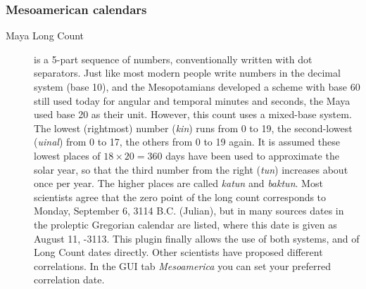 \subsubsection{Mesoamerican calendars}
\begin{description}
\item[Maya Long Count] is a 5-part sequence of numbers, conventionally 
  written with dot separators. Just like most
  modern people write numbers in the decimal system (base 10), and the
  Mesopotamians developed a scheme with base 60 still used today for
  angular and temporal minutes and seconds, the Maya used base 20 as their
  unit. However, this count uses a mixed-base system. The lowest
  (rightmost) number (\emph{kin}) runs from 0 to 19, the second-lowest
  (\emph{uinal}) from 0 to 17, the others from 0 to 19 again. It is
  assumed these lowest places of $18\times20=360$ days have been used
  to approximate the solar year, so that the third number from the
  right (\emph{tun}) increases about once per year. The higher places
  are called \emph{katun} and \emph{baktun}. Most scientists agree
  that the zero point of the long count corresponds to Monday,
  September 6, 3114 B.C. (Julian), but in many sources dates in the
  proleptic Gregorian calendar are listed, where this date is given as
  August 11, -3113. This plugin finally allows the use of both
  systems, and of Long Count dates directly. Other scientists have 
  proposed different correlations. In the GUI tab \emph{Mesoamerica} 
  you can set your preferred correlation date.  


\end{description}
